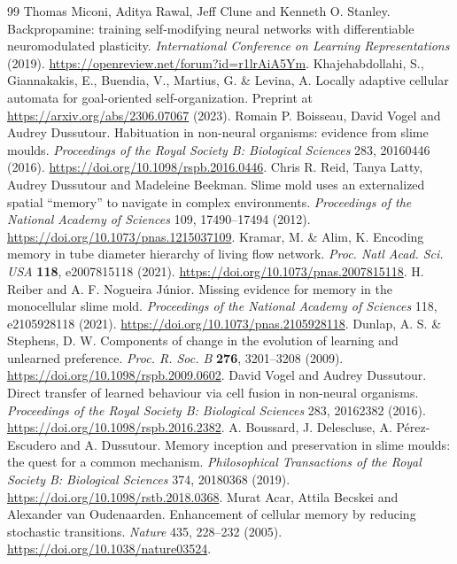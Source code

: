 \begin{thebibliography}{99}
 Thomas Miconi, Aditya Rawal, Jeff Clune and Kenneth O. Stanley. Backpropamine: training self-modifying neural networks with differentiable neuromodulated plasticity. \emph{International Conference on Learning Representations} (2019). \url{https://openreview.net/forum?id=r1lrAiA5Ym}.
 Khajehabdollahi, S., Giannakakis, E., Buendia, V., Martius, G. \& Levina, A. Locally adaptive cellular automata for goal-oriented self-organization. Preprint at \url{https://arxiv.org/abs/2306.07067} (2023).
 Romain P. Boisseau, David Vogel and Audrey Dussutour. Habituation in non-neural organisms: evidence from slime moulds. \emph{Proceedings of the Royal Society B: Biological Sciences} 283, 20160446 (2016). \url{https://doi.org/10.1098/rspb.2016.0446}.
 Chris R. Reid, Tanya Latty, Audrey Dussutour and Madeleine Beekman. Slime mold uses an externalized spatial ``memory'' to navigate in complex environments. \emph{Proceedings of the National Academy of Sciences} 109, 17490--17494 (2012). \url{https://doi.org/10.1073/pnas.1215037109}.
 Kramar, M. \& Alim, K. Encoding memory in tube diameter hierarchy of living flow network. \emph{Proc. Natl Acad. Sci. USA} \textbf{118}, e2007815118 (2021). \url{https://doi.org/10.1073/pnas.2007815118}.
 H. Reiber and A. F. Nogueira J\'{u}nior. Missing evidence for memory in the monocellular slime mold. \emph{Proceedings of the National Academy of Sciences} 118, e2105928118 (2021). \url{https://doi.org/10.1073/pnas.2105928118}.
 Dunlap, A. S. \& Stephens, D. W. Components of change in the evolution of learning and unlearned preference. \emph{Proc. R. Soc. B} \textbf{276}, 3201--3208 (2009). \url{https://doi.org/10.1098/rspb.2009.0602}.
 David Vogel and Audrey Dussutour. Direct transfer of learned behaviour via cell fusion in non-neural organisms. \emph{Proceedings of the Royal Society B: Biological Sciences} 283, 20162382 (2016). \url{https://doi.org/10.1098/rspb.2016.2382}.
 A. Boussard, J. Delescluse, A. P\'{e}rez-Escudero and A. Dussutour. Memory inception and preservation in slime moulds: the quest for a common mechanism. \emph{Philosophical Transactions of the Royal Society B: Biological Sciences} 374, 20180368 (2019). \url{https://doi.org/10.1098/rstb.2018.0368}.
 Murat Acar, Attila Becskei and Alexander van Oudenaarden. Enhancement of cellular memory by reducing stochastic transitions. \emph{Nature} 435, 228--232 (2005). \url{https://doi.org/10.1038/nature03524}.

\end{thebibliography}
